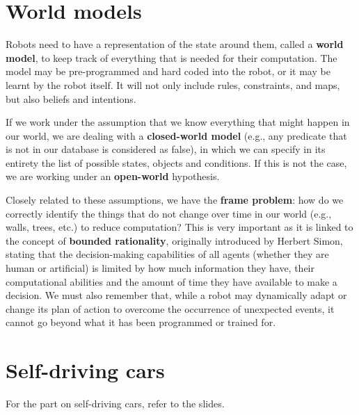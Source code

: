 \section{World models}
Robots need to have a representation of the state around them, called a \textbf{world model}, to keep track of everything that is needed for their computation. The model may be pre-programmed and hard coded into the robot, or it may be learnt by the robot itself. It will not only include rules, constraints, and maps, but also beliefs and intentions.

If we work under the assumption that we know everything that might happen in our world, we are dealing with a \textbf{closed-world model} (e.g., any predicate that is not in our database is considered as false), in which we can specify in its entirety the list of possible states, objects and conditions. If this is not the case, we are working under an \textbf{open-world} hypothesis.

Closely related to these assumptions, we have the \textbf{frame problem}: how do we correctly identify the things that do not change over time in our world (e.g., walls, trees, etc.) to reduce computation? This is very important as it is linked to the concept of \textbf{bounded rationality}, originally introduced by Herbert Simon, stating that the decision-making capabilities of all agents (whether they are human or artificial) is limited by how much information they have, their computational abilities and the amount of time they have available to make a decision. We must also remember that, while a robot may dynamically adapt or change its plan of action to overcome the occurrence of unexpected events, it cannot go beyond what it has been programmed or trained for.

\section{Self-driving cars}
For the part on self-driving cars, refer to the slides.